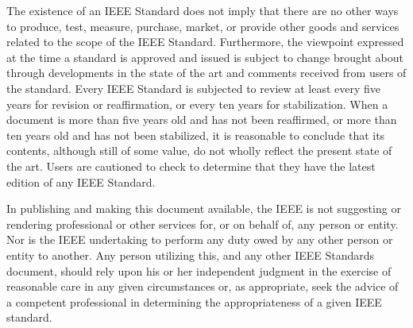 \begin{minipage}[t]{396pt}
                             \vspace{7.2pt}
                             The existence of an IEEE Standard does not imply that there are no other ways to produce, test, measure, purchase,\linebreak
                             market, or provide other goods and services related to the scope of the IEEE Standard. Furthermore, the viewpoint\linebreak
                             expressed at the time a standard is approved and issued is subject to change brought about through developments in\linebreak
                             the state of the art and comments received from users of the standard. Every IEEE Standard is subjected to review at\linebreak
                             least every five years for revision or reaffirmation, or every ten years for stabilization. When a document is more\linebreak
                             than five years old and has not been reaffirmed, or more than ten years old and has not been stabilized, it is\linebreak
                             reasonable to conclude that its contents, although still of some value, do not wholly reflect the present state of the art.\linebreak
                             Users are cautioned to check to determine that they have the latest edition of any IEEE Standard.\par

                             \vspace{7.3pt}
                             In publishing and making this document available, the IEEE is not suggesting or rendering professional or other\linebreak
                             services for, or on behalf of, any person or entity. Nor is the IEEE undertaking to perform any duty owed by any\linebreak
                             other person or entity to another. Any person utilizing this, and any other IEEE Standards document, should rely\linebreak
                             upon his or her independent judgment in the exercise of reasonable care in any given circumstances or, as\linebreak
                             appropriate, seek the advice of a competent professional in determining the appropriateness of a given IEEE\linebreak
                             standard.\par


\end{minipage}
